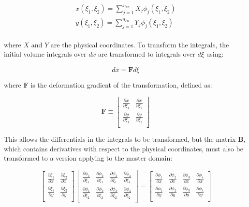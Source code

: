 \documentclass[10pt]{article}
\begin{document}
\begin{equation}
\begin{aligned}
x(\xi_1,\xi_2)=\sum_{j=1}^{n_{en}}X_{j}\phi_j(\xi_1,\xi_2)\\
y(\xi_1,\xi_2)=\sum_{j=1}^{n_{en}}Y_{j}\phi_j(\xi_1,\xi_2)\\
\end{aligned}
\end{equation}

where \(X\) and \(Y\) are the physical coordinates. To transform the integrals, the initial volume integrals over \(d\bar{x}\) are transformed to integrals over \(d\bar{\xi}\) using:

\begin{equation}
d\bar{x}=\textbf{F}d\bar{\xi}
\end{equation}

where \(\textbf{F}\) is the deformation gradient of the transformation, defined as:

\begin{equation}
\textbf{F}\equiv\begin{bmatrix}
\frac{\partial x}{\partial \xi_1} & \frac{\partial x}{\partial \xi_2} \\
\frac{\partial y}{\partial \xi_1} & \frac{\partial y}{\partial \xi_2} \\
\end{bmatrix}
\end{equation}

This allows the differentials in the integrals to be transformed, but the matrix \textbf{B}, which contains derivatives with respect to the physical coordinates, must also be transformed to a version applying to the master domain:

\begin{equation}
\begin{bmatrix}\frac{\partial\xi_1}{\partial x} & \frac{\partial\xi_2}{\partial x}\\
\frac{\partial\xi_1}{\partial y} & \frac{\partial\xi_2}{\partial y}\\
\end{bmatrix}
\begin{bmatrix}
\frac{\partial\phi_1}{\partial \xi_1} & \frac{\partial\phi_2}{\partial \xi_1} & \frac{\partial\phi_3}{\partial \xi_1} & \frac{\partial\phi_4}{\partial \xi_1}\\
\frac{\partial\phi_1}{\partial \xi_2} & \frac{\partial\phi_2}{\partial \xi_2} & \frac{\partial\phi_3}{\partial \xi_2} & \frac{\partial\phi_4}{\partial \xi_2}\\
\end{bmatrix}=
\begin{bmatrix}\frac{\partial \phi_1}{\partial x} & \frac{\partial \phi_2}{\partial x} & \frac{\partial \phi_3}{\partial x} & \frac{\partial \phi_4}{\partial x}\\
\frac{\partial \phi_1}{\partial y} & \frac{\partial \phi_2}{\partial y} & \frac{\partial \phi_3}{\partial y} & \frac{\partial \phi_4}{\partial y}\\
\end{bmatrix}
\end{equation}
\end{document}
